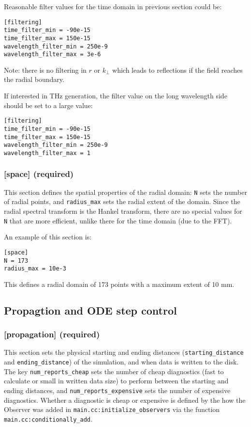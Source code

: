 \documentclass{article}
\begin{document}
Reasonable filter values for the time domain in previous section could
be:
\begin{lstlisting}
[filtering]
time_filter_min = -90e-15
time_filter_max = 150e-15
wavelength_filter_min = 250e-9
wavelength_filter_max = 3e-6
\end{lstlisting}

Note: there is no filtering in $r$ or $k_\perp$ which leads to
reflections if the field reaches the radial boundary.

If interested in THz generation, the filter value on the long
wavelength side should be set to a large value:
\begin{lstlisting}
[filtering]
time_filter_min = -90e-15
time_filter_max = 150e-15
wavelength_filter_min = 250e-9
wavelength_filter_max = 1
\end{lstlisting}

\subsubsection{[space] (required)}
This section defines the spatial properties of the radial domain:
\texttt{N} sets the number of radial points, and \texttt{radius\_max}
sets the radial extent of the domain. Since the radial spectral
transform is the Hankel transform, there are no special values for
\texttt{N} that are more efficient, unlike there for the time domain
(due to the FFT).

An example of this section is:
\begin{lstlisting}
[space]
N = 173
radius_max = 10e-3
\end{lstlisting}

This defines a radial domain of 173 points with a maximum extent of 10
mm.

\subsection{Propagtion and ODE step control}
\subsubsection{[propagation] (required)}
This section sets the physical starting and ending distances
(\texttt{starting\_distance} and \texttt{ending\_distance}) of the
simulation, and when data is written to the disk.  The key
\texttt{num\_reports\_cheap} sets the number of cheap diagnostics
(fast to calculate or small in written data size) to perform between
the starting and ending distances, and
\texttt{num\_reports\_expensive} sets the number of expensive
diagnostics. Whether a diagnostic is cheap or expensive is defined by
the how the Observer was added in
\texttt{main.cc:initialize\_observers} via the function
\texttt{main.cc:conditionally\_add}.
\end{document}
